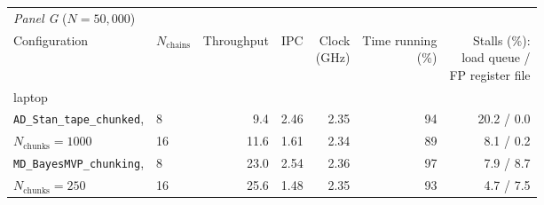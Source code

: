 \begin{table}[H]
{\begin{tabular}{llrrrrr}
\multicolumn{7}{l}{\textit{Panel G} ($N{=}50,000$)} \\
Configuration & $N_{\text{chains}}$ & Throughput & IPC & \makecell[r]{Clock \\ (GHz)} & \makecell[r]{Time running \\ (\%)} & \makecell[r]{Stalls (\%): \\ load queue / \\ FP register file} \\
\hline
\multicolumn{7}{l}{laptop} \\
\texttt{AD\_Stan\_tape\_chunked}, & 8 & 9.4 & 2.46 & 2.35 & 94 & 20.2 / 0.0 \\
$N_{\text{chunks}} = 1000$ & 16 & 11.6 & 1.61 & 2.34 & 89 & 8.1 / 0.2 \\
\texttt{MD\_BayesMVP\_chunking}, & 8 & 23.0 & 2.54 & 2.36 & 97 & 7.9 / 8.7 \\
$N_{\text{chunks}} = 250$ & 16 & 25.6 & 1.48 & 2.35 & 93 & 4.7 / 7.5 \\

\end{tabular}}
\end{table}
